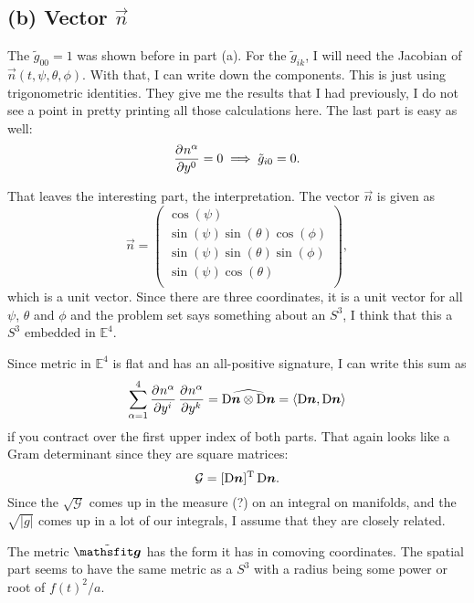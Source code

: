 \subsection*{(b) Vector $\vec n$}

The $\tilde g_{00} = 1$ was shown before in part (a). For the $\tilde g_{ik}$,
I will need the Jacobian of $\vec n(t, \psi, \theta, \phi)$. With that, I can
write down the components. This is just using trigonometric identities. They
give me the results that I had previously, I do not see a point in pretty
printing all those calculations here. The last part is easy as well:
\[
    \dpd{{n^\alpha}}{{y^0}} = 0 \implies \tilde g_{i0} = 0.
\]

That leaves the interesting part, the interpretation. The vector $\vec n$ is
given as
\[
    \vec n = \begin{pmatrix}
        \cos(\psi) \\
        \sin(\psi) \sin(\theta) \cos(\phi) \\
        \sin(\psi) \sin(\theta) \sin(\phi) \\
        \sin(\psi) \cos(\theta) \\
    \end{pmatrix},
\]
which is a unit vector. Since there are three coordinates, it is a unit vector
for all $\psi$, $\theta$ and $\phi$ and the problem set says something about an
$S^3$, I think that this a $S^3$ embedded in $\mathbb E^4$.

Since metric in $\mathbb E^4$ is flat and has an all-positive signature, I can
write this sum as
\[
    \sum_{\alpha = 1}^4 \dpd{{n^\alpha}}{{y^i}} \dpd{{n^\alpha}} {{y^k}}
    = \widehat{\Dif \vec n \otimes \Dif \vec n} = \inner{\Dif \vec n}{\Dif \vec
    n}
\]
if you contract over the first upper index of both parts. That again looks like
a Gram determinant since they are square matrices:
\[
    \mathcal G = [\Dif \vec n]^\mathrm T \Dif \vec n.
\]
Since the $\sqrt{\mathcal G}$ comes up in the measure (?) on an integral on
manifolds, and the $\sqrt{|g|}$ comes up in a lot of our integrals, I assume
that they are closely related.

The metric $\tilde{\tens g}$ has the form it has in comoving coordinates. The
spatial part seems to have the same metric as a $S^3$ with a radius being some
power or root of $f(t)^2/a$.

\IfFileExists{\bibliographyfile}{
    \printbibliography
}{}



